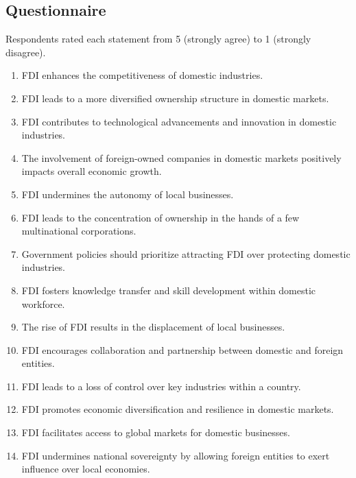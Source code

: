 \documentclass[sn-basic]{sn-jnl}
\begin{document}
\begin{appendices}

\section{Questionnaire}\label{app:q}

Respondents rated each statement from 5 (strongly agree) to 1 (strongly disagree).

\begin{enumerate}
\item FDI enhances the competitiveness of domestic industries.
\item FDI leads to a more diversified ownership structure in domestic markets.
\item FDI contributes to technological advancements and innovation in domestic industries.
\item The involvement of foreign-owned companies in domestic markets positively impacts overall economic growth.
\item FDI undermines the autonomy of local businesses.
\item FDI leads to the concentration of ownership in the hands of a few multinational corporations.
\item Government policies should prioritize attracting FDI over protecting domestic industries.
\item FDI fosters knowledge transfer and skill development within domestic workforce.
\item The rise of FDI results in the displacement of local businesses.
\item FDI encourages collaboration and partnership between domestic and foreign entities.
\item FDI leads to a loss of control over key industries within a country.
\item FDI promotes economic diversification and resilience in domestic markets.
\item FDI facilitates access to global markets for domestic businesses.
\item FDI undermines national sovereignty by allowing foreign entities to exert influence over local economies.
\end{enumerate}

\end{appendices}


\end{document}
